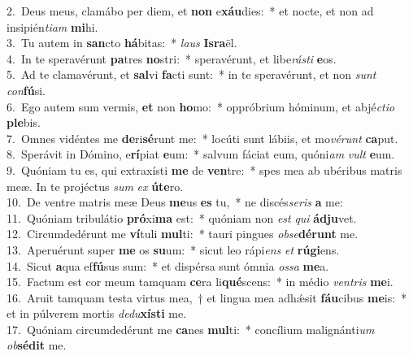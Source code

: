 {2.~}Deus meus, clamábo per diem, et \textbf{non} e\textbf{xáu}dies:~* et nocte, et non ad insipién\textit{ti}\textit{am} \textbf{mi}hi.\\
{3.~}Tu autem in \textbf{san}cto \textbf{há}bitas:~* \textit{laus} \textbf{Is}\textbf{ra}ël.\\
{4.~}In te speravérunt \textbf{pa}tres \textbf{no}stri:~* speravérunt, et libe\textit{rá}\textit{sti} \textbf{e}os.\\
{5.~}Ad te clamavérunt, et \textbf{sal}vi \textbf{fa}cti sunt:~* in te speravérunt, et non \textit{sunt} \textit{con}\textbf{fú}si.\\
{6.~}Ego autem sum vermis, \textbf{et} non \textbf{ho}mo:~* oppróbrium hóminum, et abjé\textit{cti}\textit{o} \textbf{ple}bis.\\
{7.~}Omnes vidéntes me \textbf{de}ri\textbf{sé}runt me:~* locúti sunt lábiis, et mo\textit{vé}\textit{runt} \textbf{ca}put.\\
{8.~}Sperávit in Dómino, e\textbf{rí}piat \textbf{e}um:~* salvum fáciat eum, quóni\textit{am} \textit{vult} \textbf{e}um.\\
{9.~}Quóniam tu es, qui extraxísti \textbf{me} de \textbf{ven}tre:~* spes mea ab ubéribus matris meæ. In te projéctus \textit{sum} \textit{ex} \textbf{ú}\textbf{te}ro.\\
{10.~}De ventre matris meæ Deus \textbf{me}us \textbf{es} tu,~* ne discés\textit{se}\textit{ris} \textbf{a} me:\\
{11.~}Quóniam tribulátio \textbf{pró}xi\textbf{ma} est:~* quóniam non \textit{est} \textit{qui} \textbf{ád}\textbf{ju}vet.\\
{12.~}Circumdedérunt me \textbf{ví}tuli \textbf{mul}ti:~* tauri pingues \textit{ob}\textit{se}\textbf{dé}\textbf{runt} me.\\
{13.~}Aperuérunt super \textbf{me} os \textbf{su}um:~* sicut leo rápi\textit{ens} \textit{et} \textbf{rú}\textbf{gi}ens.\\
{14.~}Sicut \textbf{a}qua ef\textbf{fú}sus sum:~* et dispérsa sunt ómnia \textit{os}\textit{sa} \textbf{me}a.\\
{15.~}Factum est cor meum tamquam \textbf{ce}ra li\textbf{qué}scens:~* in médio \textit{ven}\textit{tris} \textbf{me}i.\\
{16.~}Aruit tamquam testa virtus mea,~† et lingua mea adhǽsit \textbf{fáu}cibus \textbf{me}is:~* et in púlverem mortis \textit{de}\textit{du}\textbf{xí}\textbf{sti} me.\\
{17.~}Quóniam circumdedérunt me \textbf{ca}nes \textbf{mul}ti:~* concílium malignánti\textit{um} \textit{ob}\textbf{sé}\textbf{dit} me.\\
